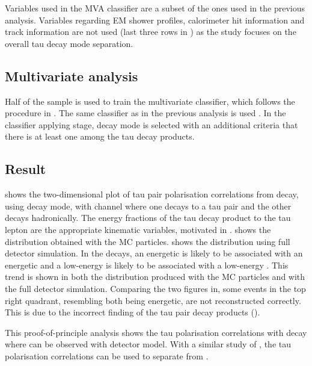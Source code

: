Variables used in  the MVA classifier are a subset of the ones used in the previous analysis. Variables regarding EM shower profiles, calorimeter hit information and track information are not used (last three rows in ) as the study focuses on the overall tau decay mode separation.



\subsection{Multivariate analysis}

Half of the sample is used to train the multivariate classifier,  which follows the procedure in  . The same classifier as in the previous analysis  is used .   In the classifier applying stage, \tauToPion decay mode is selected with an additional criteria that there is at least one \Ppipm among the tau decay products.

\subsection{Result}

 shows the two-dimensional plot of tau pair polarisation correlations from \PZ decay,  using \tauToPion decay mode, with \eeZZ channel where one \PZ decays to a tau pair and the other \PZ decays hadronically. The energy fractions of the tau decay product to the tau lepton are the appropriate kinematic variables, motivated in .  shows the distribution obtained with the MC particles.  shows the distribution using full detector simulation. In the \ZToTauTau decays, an energetic \Ppiplus is likely to be associated with an energetic \Ppiminus and a low-energy \Ppiplus is  likely to be associated with a low-energy \Ppiminus. This trend is shown in both the distribution produced with the MC particles and with the full detector simulation. Comparing the two figures in, some events in the top right quadrant, resembling both \Ppipm being energetic, are not reconstructed correctly. This is due to the incorrect finding of the tau pair decay products ().

This proof-of-principle analysis shows the tau polarisation correlations with \ZToTauTau decay where \tauToPion can be observed with \ILD detector model. With a similar study of \HiggsToTauTau,  the tau polarisation correlations can be used to separate \PHiggs from \PZ.


